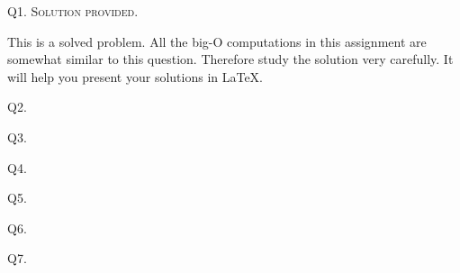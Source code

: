 

\newpage
Q1. \textsc{Solution provided.}

This is a solved problem.
All the big-O computations in this assignment
are somewhat similar to this question.
Therefore study the solution very carefully.
It will help you present your solutions in \LaTeX.



\newpage
\SOLUTION



\newpage
Q2.


\newpage
\SOLUTION



\newpage
Q3.


\newpage
\SOLUTION



\newpage
Q4.


\newpage
\SOLUTION



\newpage
Q5.


\newpage
\SOLUTION



\newpage
Q6.


\SOLUTION



\newpage
Q7.


\newpage
\SOLUTION




